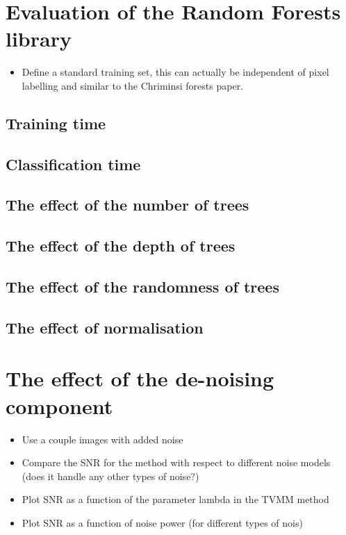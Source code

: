 \documentclass[12pt,twoside,notitlepage]{report}
\begin{document}
    \section{Evaluation of the Random Forests library}
        \begin{itemize}
            \item Define a standard training set, this can actually be independent of pixel labelling and similar to the Chriminsi forests paper.
        \end{itemize}

        \subsection{Training time}
        \subsection{Classification time}
        \subsection{The effect of the number of trees}
        \subsection{The effect of the depth of trees}
        \subsection{The effect of the randomness of trees}
        \subsection{The effect of normalisation} \label{sec:effect_of_normalisation}


    \section{The effect of the de-noising component}
        \begin{itemize}
            \item Use a couple images with added noise
            \item Compare the SNR for the method with respect to different noise models (does it handle any other types of noise?)
            \item Plot SNR as a function of the parameter lambda in the TVMM method
            \item Plot SNR as a function of noise power (for different types of nois)
        \end{itemize}
\end{document}
